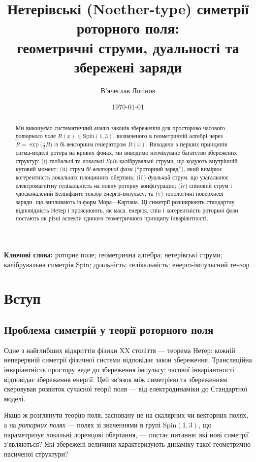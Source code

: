 \documentclass[11pt,a4paper]{article}
\title{Нетерівські (Noether-type) симетрії роторного поля:\\
геометричні струми, дуальності та збережені заряди}
\author[1]{В'ячеслав Логінов}
\affil[1]{Київ, Україна\\ \texttt{barthez.slavik@gmail.com}}
\date{\today}
\numberwithin{equation}{section}
\theoremstyle{plain}
\theoremstyle{definition}
\theoremstyle{remark}
\newcommand{\keywords}{\textbf{Ключові слова:} роторне поле; геометрична алгебра; нетерівські струми; калібрувальна симетрія Spin; дуальність; гелікальність; енерго-імпульсний тензор}
\begin{document}
\maketitle

\begin{abstract}
Ми виконуємо систематичний аналіз законів збереження для просторово-часового \emph{роторного поля} $R(x)\in \mathrm{Spin}(1,3)$, визначеного в геометричній алгебрі через $R=\exp\!\big(\tfrac{1}{2}B\big)$ із бі-векторним генератором $B(x)$. Виходячи з перших принципів сигма-моделі ротора на кривих фонах, ми виводимо неочікуване багатство збережених структур: (i) глобальні та локальні \emph{Spin}-калібрувальні струми, що кодують внутрішній кутовий момент; (ii) струм \emph{бі-векторної фази} (``роторний заряд''), який вимірює когерентність локальних площинних обертань; (iii) \emph{дуальний} струм, що узагальнює електромагнітну гелікальність на повну роторну конфігурацію; (iv) спіновий струм і удосконалений Белінфанте тензор енергії-імпульсу; та (v) топологічні поверхневі заряди, що випливають із форм Мора—Картана. Ці симетрії розширюють стандартну відповідність Нетер і прояснюють, як маса, енергія, спін і когерентність роторної фази постають як різні аспекти єдиного геометричного принципу інваріантності.
\end{abstract}

\keywords

\section{Вступ}
\label{sec:intro}

\subsection{Проблема симетрій у теорії роторного поля}

Одне з найглибших відкриттів фізики XX століття — теорема Нетер: кожній неперервній симетрії фізичної системи відповідає закон збереження. Трансляційна інваріантність простору веде до збереження імпульсу; часової інваріантності відповідає збереження енергії. Цей зв’язок між симетрією та збереженням скеровував розвиток сучасної теорії поля — від електродинаміки до Стандартної моделі.

Якщо ж розглянути теорію поля, засновану не на скалярних чи векторних полях, а на \emph{роторних полях} — полях зі значеннями в групі $\mathrm{Spin}(1,3)$, що параметризує локальні лоренцові обертання, — постає питання: які нові симетрії з’являються? Які збережені величини характеризують динаміку такої геометрично насиченої структури?
\end{document}
